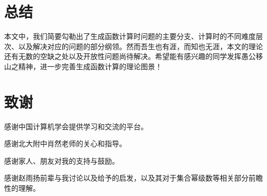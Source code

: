 






\section{总结}

本文中，我们简要勾勒出了生成函数计算时问题的主要分支、计算时的不同难度层次、以及解决对应的问题的部分纲领。然而吾生也有涯，而知也无涯，本文的理论还有无数的空缺之处以及开放性问题尚待解决。希望能有感兴趣的同学发挥愚公移山之精神，进一步完善生成函数计算的理论图景！

\section*{致谢}

感谢中国计算机学会提供学习和交流的平台。

感谢北大附中肖然老师的关心和指导。

感谢家人、朋友对我的支持与鼓励。

感谢赵雨扬前辈与我讨论以及给予的启发，以及其对于集合幂级数等相关部分前瞻性的理解。

